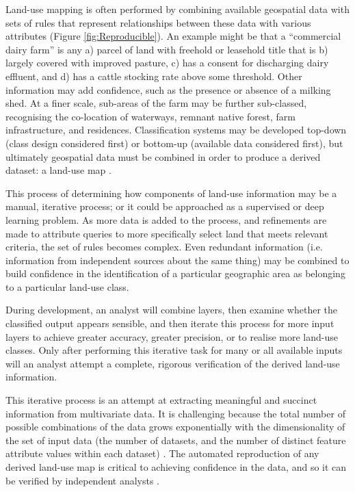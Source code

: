 \documentclass[]{interact}
\theoremstyle{plain}%
\theoremstyle{definition}
\theoremstyle{remark}
\begin{document}
Land-use mapping is often performed by combining available geospatial data with sets of rules that represent relationships between these data with various attributes (Figure \ref{fig:Reproducible}). An example might be that a ``commercial dairy farm'' is any a) parcel of land with freehold or leasehold title that is b) largely covered with improved pasture, c) has a consent for discharging dairy effluent, and d) has a cattle stocking rate above some threshold. Other information may add confidence, such as the presence or absence of a milking shed. At a finer scale, sub-areas of the farm may be further sub-classed, recognising the co-location of waterways, remnant native forest, farm infrastructure, and residences. Classification systems may be developed top-down (class design considered first) or bottom-up (available data considered first), but ultimately geospatial data must be combined in order to produce a derived dataset: a land-use map \citep{rutledge2009geospatial}.

This process of determining how components of land-use information may be a manual, iterative process; or it could be approached as a supervised or deep learning problem. As more data is added to the process, and refinements are made to attribute queries to more specifically select land that meets relevant criteria, the set of rules becomes complex. Even redundant information (i.e. information from independent sources about the same thing) may be combined to build confidence in the identification of a particular geographic area as belonging to a particular land-use class.

During development, an analyst will combine layers, then examine whether the classified output appears sensible, and then iterate this process for more input layers to achieve greater accuracy, greater precision, or to realise more land-use classes. Only after performing this iterative task for many or all available inputs will an analyst attempt a complete, rigorous verification of the derived land-use information. 

This iterative process is an attempt at extracting meaningful and succinct information from multivariate data. It is challenging because the total number of possible combinations of the data grows exponentially with the dimensionality of the set of input data (the number of datasets, and the number of distinct feature attribute values within each dataset) \citep{behrisch2014feedback}. The automated reproduction of any derived land-use map is critical to achieving confidence in the data, and so it can be verified by independent analysts \citep{etherington2022,baker2016}.
\end{document}
